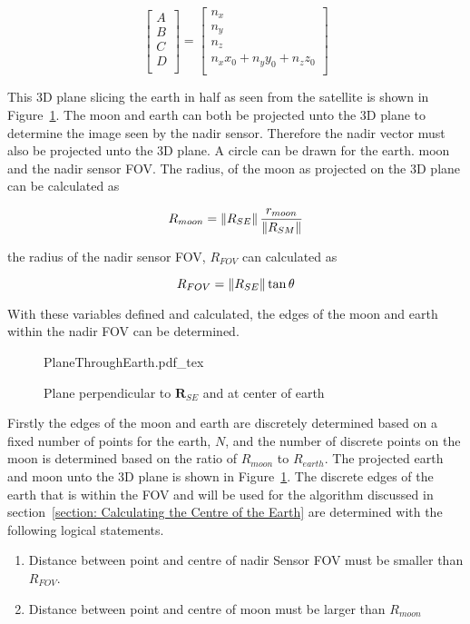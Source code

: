 \begin{equation}
\begin{bmatrix}
	A\\
	B\\
	C\\
	D\\
\end{bmatrix} = \begin{bmatrix}
n_x\\
n_y\\
n_z\\
n_xx_0 + n_yy_0 + n_zz_0\\
\end{bmatrix}
\end{equation}

This 3D plane slicing the earth in half as seen from the satellite is shown in Figure~\ref{fig:PlaneThroughEarth}. The moon and earth can both be projected unto the 3D plane to determine the image seen by the nadir sensor. Therefore the nadir vector must also be projected unto the 3D plane. A circle can be drawn for the earth. moon and the nadir sensor FOV. The radius, of the moon as projected on the 3D plane can be calculated as 

\begin{equation}
	R_{moon} = \left\lVert R_{SE}\right\rVert \frac{r_{moon}}{\left\lVert R_{SM}\right\rVert}
\end{equation}

the radius of the nadir sensor FOV, $R_{FOV}$ can calculated as 

\begin{equation}
	R_{FOV} = \left\lVert R_{SE}\right\rVert \tan \theta
\end{equation}

With these variables defined and calculated, the edges of the moon and earth within the nadir FOV can be determined.


\begin{figure}[!hbt]
	\centering
	\def\svgwidth{14cm}
	{PlaneThroughEarth.pdf_tex}
	\caption{Plane perpendicular to $\mathbf{R}_{SE}$ and at center of earth}
	\label{fig:PlaneThroughEarth}
\end{figure}

Firstly the edges of the moon and earth are discretely determined based on a fixed number of points for the earth, $N$, and the number of discrete points on the moon is determined based on the ratio of $R_{moon}$ to $R_{earth}$. The projected earth and moon unto the 3D plane is shown in Figure~\ref{fig:PlaneThroughEarth}. The discrete edges of the earth that is within the FOV and will be used for the algorithm discussed in section~\ref{section: Calculating the Centre of the Earth} are determined with the following logical statements.
\begin{enumerate}
	\item Distance between point and centre of nadir Sensor FOV must be smaller than $R_{FOV}$.
	\item Distance between point and centre of moon must be larger than $R_{moon}$
\end{enumerate}

